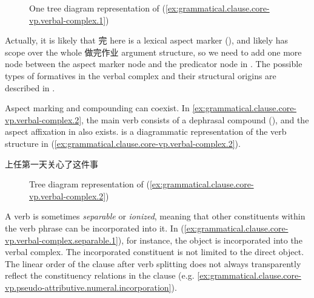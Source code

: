 \documentclass[UTF8, a4paper, oneside, scheme=plain, 12pt]{ctexrep}
\begin{document}
\begin{figure}[H]
    \centering
    {
        \small
        
    }
    \caption{One tree diagram representation of (\ref{ex:grammatical.clause.core-vp.verbal-complex.1})}
    \label{fig:grammatical.clause.core-vp.verbal-complex.1.1}
\end{figure}

Actually, it is likely that 完 here is a lexical aspect marker
(),
and likely has scope over the whole 做完作业 argument structure,
so we need to add one more node between the aspect marker node
and the predicator node in .
The possible types of formatives in the verbal complex
and their structural origins are described in .

Aspect marking and compounding can coexist.
In \ref{ex:grammatical.clause.core-vp.verbal-complex.2},
the main verb consists of a dephrasal compound (),
and the aspect affixation in  also exists.
is a diagrammatic representation of the verb structure in (\ref{ex:grammatical.clause.core-vp.verbal-complex.2}).

\begin{exe}
    \ex\label{ex:grammatical.clause.core-vp.verbal-complex.2} 上任第一天关心了这件事
\end{exe}

\begin{figure}[H]
    {
        \centering
        \small
        
    }
    \caption{Tree diagram representation of (\ref{ex:grammatical.clause.core-vp.verbal-complex.2})}
    \label{fig:grammatical.clause.core-vp.verbal-complex.2}
\end{figure}

A verb is sometimes \emph{separable} or \emph{ionized},
meaning that other constituents within the verb phrase can be incorporated into it.
In (\ref{ex:grammatical.clause.core-vp.verbal-complex.separable.1}),
for instance, the object is incorporated into the verbal complex.
The incorporated constituent is not limited to the direct object.
The linear order of the clause after verb splitting
does not always transparently reflect the constituency relations in the clause
(e.g. \ref{ex:grammatical.clause.core-vp.pseudo-attributive.numeral.incorporation}).
\end{document}
